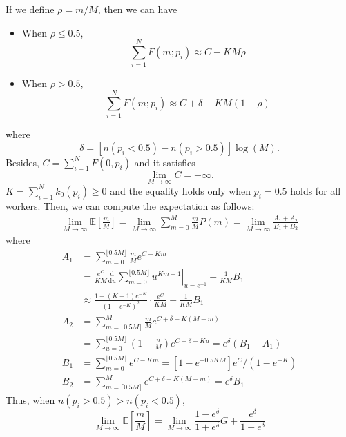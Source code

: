 \documentclass{article}
\begin{document}
If we define $\rho=m/M$, then we can have
\begin{itemize}
\item When $\rho\leq 0.5$,
\begin{equation}
\sum_{i=1}^{N}F(m;p_i)\approx C-KM\rho
\end{equation}
\item When $\rho>0.5$,
\begin{equation}
\sum_{i=1}^{N}F(m;p_i)\approx C+\delta-KM(1-\rho)
\end{equation}
\end{itemize}
where $$\delta=[n(p_i<0.5)-n(p_i>0.5)]\log(M).$$ Besides, $C=\sum_{i=1}^{N}F(0,p_i)$ and it satisfies
\begin{equation}
\lim_{M\rightarrow \infty}C=+\infty.
\end{equation}
$K=\sum_{i=1}^{N}k_0(p_i)\geq 0$ and the equality holds only when $p_i=0.5$ holds for all workers.
Then, we can compute the expectation as follows:
\begin{equation*}
\begin{split}
\lim_{M\rightarrow \infty}\mathbb{E}\left[\frac{m}{M}\right]=\lim_{M\rightarrow \infty}\sum_{m=0}^{M}\frac{m}{M}P(m)=\lim_{M\rightarrow \infty}\frac{A_1+A_2}{B_1+B_2}
\end{split}
\end{equation*}
where
\begin{equation*}
\begin{split}
A_1&= \sum_{m=0}^{\lfloor0.5M\rfloor}\frac{m}{M} e^{C-Km}\\
&=\frac{e^{C}}{KM}\frac{\mathrm{d}}{\mathrm{d}u}\left.\sum_{m=0}^{\lfloor0.5M\rfloor}u^{Km+1}\right|_{u=e^{-1}}-\frac{1}{KM}B_1\\
&\approx \frac{1+(K+1)e^{-K}}{(1-e^{-K})^2}\cdot \frac{e^C}{KM}-\frac{1}{KM}B_1\\
A_2&=\sum_{m=\lceil0.5M\rceil}^{M}\frac{m}{M} e^{C+\delta-K(M-m)}\\
&= \sum_{u=0}^{\lfloor0.5M\rfloor}\left(1-\frac{u}{M}\right) e^{C+\delta-Ku}= e^{\delta}(B_1-A_1)\\
B_1&=\sum_{m=0}^{\lfloor0.5M\rfloor}e^{C-Km}=\left[1-e^{-0.5KM}\right]e^{C}/(1-e^{-K})\\
B_2&= \sum_{m=\lceil0.5M\rceil}^{M}e^{C+\delta-K(M-m)}=e^{\delta}B_1
\end{split}
\end{equation*}
Thus, when $n(p_i>0.5)>n(p_i<0.5)$,
\begin{equation}
\label{Zero}
\lim_{M\rightarrow \infty}\mathbb{E}\left[\frac{m}{M}\right]=\lim_{M\rightarrow \infty}\frac{1-e^{\delta}}{1+e^{\delta}}G+\frac{e^{\delta}}{1+e^{\delta}}
\end{equation}
\end{document}
